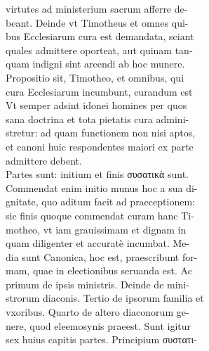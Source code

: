 \documentclass{article}
\begin{document}
\begin{pages}
                virtutes ad ministerium sacrum afferre de- \\
                beant. Deinde vt Timotheus et omnes qui- \\
                bus Ecclesiarum cura est demandata, sciant \\
                quales admittere oporteat, aut quinam tan- \\
                quam indigni sint arcendi ab hoc munere. \\
                Propositio sit, Timotheo, et omnibus, qui \\
                cura Ecclesiarum incumbunt, curandum est \\
                Vt semper adsint idonei homines per quos \\
                sana doctrina et tota pietatis cura admini- \\
                stretur: ad quam functionem non nisi aptos, \\
                et canoni huic respondentes maiori ex parte \\
                admittere debent. \\
                Partes sunt: initium et finis συσατικὰ sunt. \\
                Commendat enim initio munus hoc a sua di- \\
                gnitate, quo aditum facit ad praeceptionem: \\
                sic finis quoque commendat curam hanc Ti- \\
                motheo, vt iam grauissimam et dignam in \\
                quam diligenter et accuratè incumbat. Me- \\
                dia sunt Canonica, hoc est, praescribunt for- \\
                mam, quae in electionibus seruanda est. Ac \\
                primum de ipsis ministris. Deinde de mini- \\
                strorum diaconis. Tertio de ipsorum familia et \\
                vxoribus. Quarto de altero diaconorum ge- \\
                nere, quod eleemosynis praeest. Sunt igitur \\
                sex huius capitis partes. Principium συστατι- \\

\end{pages}
\end{document}

